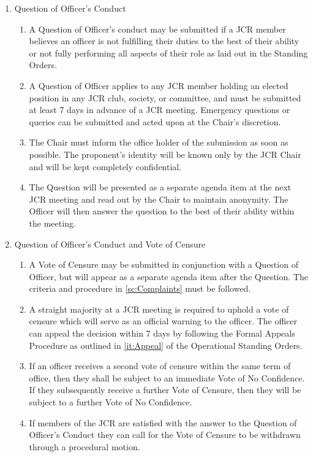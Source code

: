 \label{sc:Complaints}
\begin{enumerate}
    \item Question of Officer's Conduct
    \begin{enumerate}
        \item A Question of Officer’s conduct may be submitted if a JCR member believes an officer is not fulfilling their duties to the best of their ability or not fully performing all aspects of their role as laid out in the Standing Orders.
        \item A Question of Officer applies to any JCR member holding an elected position in any JCR club, society, or committee, and must be submitted at least 7 days in advance of a JCR meeting. Emergency questions or queries can be submitted and acted upon at the Chair’s discretion.
        \item The Chair must inform the office holder of the submission as soon as possible. The proponent’s identity will be known only by the JCR Chair and will be kept completely confidential.
        \item The Question will be presented as a separate agenda item at the next JCR meeting and read out by the Chair to maintain anonymity. The Officer will then answer the question to the best of their ability within the meeting.
    \end{enumerate}
    \item Question of Officer's Conduct and Vote of Censure
    \begin{enumerate}
        \item A Vote of Censure may be submitted in conjunction with a Question of Officer, but will appear as a separate agenda item after the Question. The criteria and procedure in \ref{sc:Complaints} must be followed.
        \item A straight majority at a JCR meeting is required to uphold a vote of censure which will serve as an official warning to the officer. The officer can appeal the decision within 7 days by following the Formal Appeals Procedure as outlined in \ref{it:Appeal} of the Operational Standing Orders.
        \item If an officer receives a second vote of censure within the same term of office, then they shall be subject to an immediate Vote of No Confidence. If they subsequently receive a further Vote of Censure, then they will be subject to a further Vote of No Confidence.
        \item If members of the JCR are satisfied with the answer to the Question of Officer’s Conduct they can call for the Vote of Censure to be withdrawn through a procedural motion.

\end{enumerate}
\end{enumerate}
